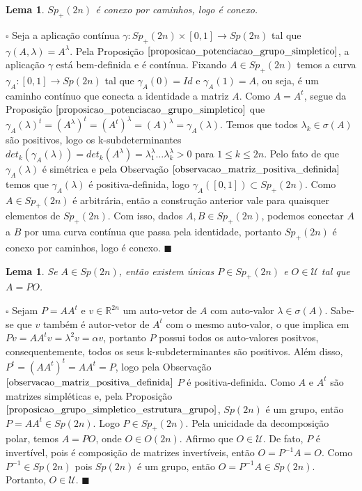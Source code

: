\documentclass[12pt]{book}
\newtheorem{lema}[teorema]{Lema}
\newenvironment{prova}[1]{$\square$ #1}{\hfill$\blacksquare$}
\newcommand{\gruposimpletico}[1]{Sp(#1)}
\newcommand{\gruposimpleticopositivo}[1]{Sp_{+}(#1)}
\newcommand{\matrizortogonal}[1]{O(#1)}
\newcommand{\matrizSimpleticaOrtogonal}{\mathcal{U}}
\newcommand{\real}[1]{\mathbb{R}^{#1}}
\begin{document}
	\begin{lema}\label{lema_decomposicao_grupo_simpletico_positivo}
		$\gruposimpleticopositivo{2n}$ é conexo por caminhos, logo é conexo.
	\end{lema}
	\begin{prova}
		Seja a aplicação contínua $\gamma:\gruposimpleticopositivo{2n}\times [0,1] \to \gruposimpletico{2n}$ tal que $\gamma(A,\lambda) = A^{\lambda}$. Pela Proposição $\ref{proposicao_potenciacao_grupo_simpletico}$, a aplicação $\gamma$ está bem-definida e é contínua. Fixando $A \in \gruposimpleticopositivo{2n}$ temos a curva $\gamma_{A}:[0,1]\to \gruposimpletico{2n}$ tal que $\gamma_{A}(0) = Id$ e $\gamma_{A}(1) = A$, ou seja, é um caminho contínuo que conecta a identidade a matriz $A$. Como $A=A^{t}$, segue da Proposição $\ref{proposicao_potenciacao_grupo_simpletico}$ que $\gamma_{A}(\lambda)^{t} = (A^{\lambda})^{t} = (A^{t})^{\lambda} = (A)^{\lambda} = \gamma_{A}(\lambda)$. Temos que todos $\lambda_{k} \in \sigma(A)$ são positivos, logo os k-subdeterminantes $det_{k}(\gamma_{A}(\lambda)) = det_{k}(A^{\lambda}) = \lambda_{1}^{\lambda}\dots\lambda_{k}^{\lambda}>0$ para $1\leq k \leq 2n$. Pelo fato de que $\gamma_{A}(\lambda)$ é simétrica e pela Observação $\ref{observacao_matriz_positiva_definida}$ temos que $\gamma_{A}(\lambda)$ é positiva-definida, logo $\gamma_{A}([0,1]) \subset \gruposimpleticopositivo{2n}$. Como $A \in \gruposimpleticopositivo{2n}$ é arbitrária, então a construção anterior vale para quaisquer elementos de $\gruposimpleticopositivo{2n}$. Com isso, dados $A, B \in \gruposimpleticopositivo{2n}$, podemos conectar $A$ a $B$ por uma curva contínua que passa pela identidade, portanto $\gruposimpleticopositivo{2n}$ é conexo por caminhos, logo é conexo.
	\end{prova}	
	
	\begin{lema}
		Se $A \in \gruposimpletico{2n}$, então existem únicas $P \in \gruposimpleticopositivo{2n}$ e $O \in \matrizSimpleticaOrtogonal$ tal que $A=PO$.
	\end{lema}
	\begin{prova}
		Sejam $P = AA^{t}$ e $v \in \real{2n}$ um auto-vetor de $A$ com auto-valor $\lambda \in \sigma(A)$. Sabe-se que $v$ também é autor-vetor de $A^{t}$ com o mesmo auto-valor, o que implica em $Pv=AA^{t}v = \lambda^{2}v = \alpha v$, portanto $P$ possui todos os auto-valores positvos, consequentemente, todos os seus k-subdeterminantes são positivos. Além disso, $P^{t} = (AA^{t})^{t} = AA^{t} = P$, logo pela Observação $\ref{observacao_matriz_positiva_definida}$ $P$ é positiva-definida. Como $A$ e $A^{t} $ são matrizes simpléticas e, pela Proposição $\ref{proposicao_grupo_simpletico_estrutura_grupo}$, $\gruposimpletico{2n}$ é um grupo, então $P=AA^{t}\in \gruposimpletico{2n}$. Logo $P \in \gruposimpleticopositivo{2n}$. Pela unicidade da decomposição polar, temos $A=PO$, onde $O \in \matrizortogonal{2n}$. Afirmo que $O \in \matrizSimpleticaOrtogonal$. De fato, $P$ é invertível, pois é composição de matrizes invertíveis, então $O = P^{-1}A =O$. Como $P^{-1} \in \gruposimpletico{2n}$ pois $\gruposimpletico{2n}$ é um grupo, então $O=P^{-1}A \in \gruposimpletico{2n}$. Portanto, $O \in \matrizSimpleticaOrtogonal$.
	\end{prova}
	
\end{document}
